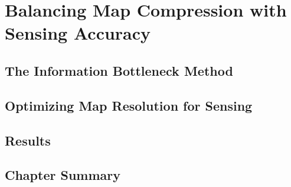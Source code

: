 \chapter{Balancing Map Compression with Sensing Accuracy}

\section{The Information Bottleneck Method}

\section{Optimizing Map Resolution for Sensing}

\section{Results}

\section{Chapter Summary}
